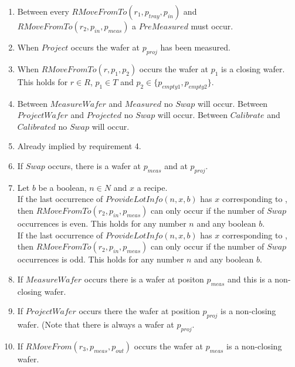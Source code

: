 \begin{enumerate}
    \item Between every $\mathit{RMoveFromTo}(r_1, p_\mathit{tray},p_\mathit{in})$ and $\mathit{RMoveFromTo}(r_2, p_\mathit{in}, p_\mathit{meas})$ a $\mathit{PreMeasured}$ must occur.

    \item When $Project$ occurs the wafer at $p_\mathit{proj}$ has been measured.

    \item When $RMoveFromTo(r, p_1, p_2)$ occurs the wafer at $p_1$ is a closing wafer. This holds for $r \in R$, $p_1 \in T$ and $p_2 \in \{p_\textit{empty1}, p_\textit{empty2}\}$.
    
    \item Between $MeasureWafer$ and $Measured$ no $Swap$ will occur. Between $ProjectWafer$ and $Projected$ no $Swap$ will occur. Between $Calibrate$ and $Calibrated$ no $Swap$ will occur.

    \item Already implied by requirement 4. 
    
    \item If $Swap$ occurs, there is a wafer at $p_\mathit{meas}$ and at $p_\mathit{proj}$.

    \item Let $b$ be a boolean, $n \in N$ and $x$ a recipe.  \\
        If the last occurrence of $\mathit{ProvideLotInfo}(n, x, b)$ has $x$ corresponding to \recipeOne, then $\mathit{RMoveFromTo}(r_2,p_\mathit{in},p_\mathit{meas})$ can only occur if the number of $\mathit{Swap}$ occurrences is even.
        This holds for any number $n$ and any boolean $b$. \\
        If the last occurrence of $\mathit{ProvideLotInfo}(n, x, b)$ has $x$ corresponding to \recipeTwo, then $\mathit{RMoveFromTo}(r_2,p_\mathit{in},p_\mathit{meas})$ can only occur if the number of $\mathit{Swap}$ occurrences is odd.
        This holds for any number $n$ and any boolean $b$. \\

    \item If $MeasureWafer$ occurs there is a wafer at positon $p_\mathit{meas}$ and this is a non-closing wafer.
    \item If $ProjectWafer$ occurs there the wafer at position $p_\mathit{proj}$ is a non-closing wafer. (Note that there is always a wafer at $p_\mathit{proj}$.

    \item If $RMoveFrom(r_3,p_\mathit{meas}, p_\mathit{out})$ occurs the wafer at $p_\mathit{meas}$ is a non-closing wafer.


\end{enumerate}
